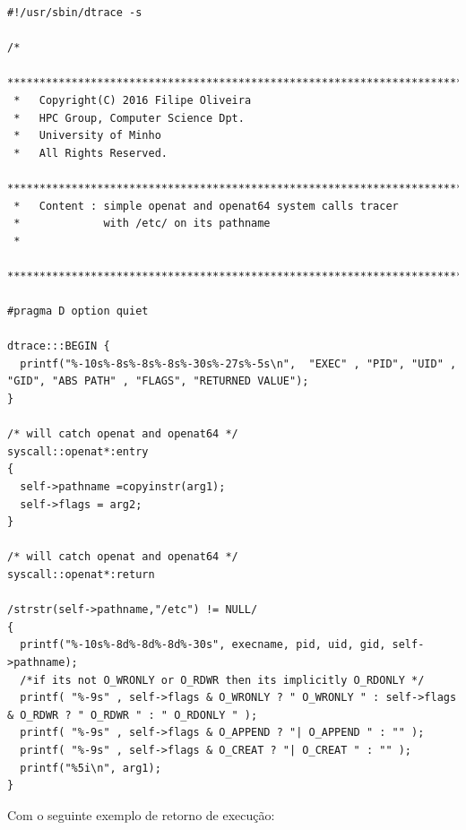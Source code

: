 \documentclass[a4paper]{article}
\begin{document}
\begin{lstlisting}[basicstyle=\scriptsize]
#!/usr/sbin/dtrace -s

/*
 ********************************************************************************
 *   Copyright(C) 2016 Filipe Oliveira
 *   HPC Group, Computer Science Dpt.
 *   University of Minho
 *   All Rights Reserved.
 ********************************************************************************
 *   Content : simple openat and openat64 system calls tracer 
 *             with /etc/ on its pathname
 *     
 ********************************************************************************/

#pragma D option quiet

dtrace:::BEGIN {
  printf("%-10s%-8s%-8s%-8s%-30s%-27s%-5s\n",  "EXEC" , "PID", "UID" , "GID", "ABS PATH" , "FLAGS", "RETURNED VALUE");
}

/* will catch openat and openat64 */
syscall::openat*:entry
{
  self->pathname =copyinstr(arg1);
  self->flags = arg2;
}

/* will catch openat and openat64 */
syscall::openat*:return

/strstr(self->pathname,"/etc") != NULL/
{
  printf("%-10s%-8d%-8d%-8d%-30s", execname, pid, uid, gid, self->pathname);
  /*if its not O_WRONLY or O_RDWR then its implicitly O_RDONLY */
  printf( "%-9s" , self->flags & O_WRONLY ? " O_WRONLY " : self->flags & O_RDWR ? " O_RDWR " : " O_RDONLY " ); 
  printf( "%-9s" , self->flags & O_APPEND ? "| O_APPEND " : "" );
  printf( "%-9s" , self->flags & O_CREAT ? "| O_CREAT " : "" );
  printf("%5i\n", arg1);
}
\end{lstlisting}

Com o seguinte exemplo de retorno de execução:
\end{document}
